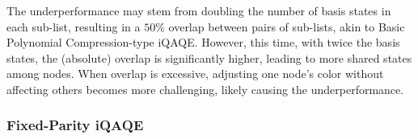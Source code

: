 \vspace*{-2.5mm}

The underperformance may stem from doubling the number of basis states in each sub-list, resulting in a $50\%$ overlap between pairs of sub-lists, akin to Basic Polynomial Compression-type iQAQE. However, this time, with twice the basis states, the (absolute) overlap is significantly higher, leading to more shared states among nodes. When overlap is excessive, adjusting one node's color without affecting others becomes more challenging, likely causing the underperformance.

\subsubsection{Fixed-Parity iQAQE}
\label{subsubsection:Fixed-Parity_iQAQE}

